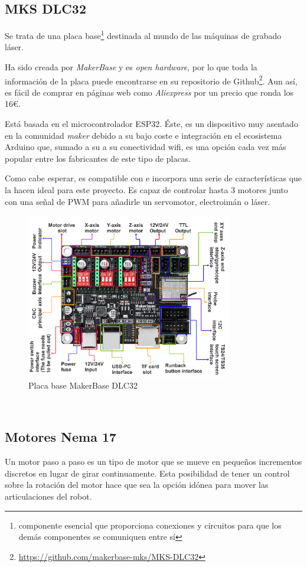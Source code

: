 \subsection{MKS DLC32}
\label{subsec:mksdlc32}
\noindent Se trata de una placa base\footnote{componente esencial que proporciona conexiones y circuitos para que los demás componentes se comuniquen entre sí} destinada al mundo de las máquinas de grabado láser. 

Ha sido creada por \textit{MakerBase} y es \textit{open hardware}, por lo que toda la información de la placa 
puede encontrarse en su repositorio de Github\footnote{\url{https://github.com/makerbase-mks/MKS-DLC32}}. Aun así, es fácil de comprar 
en páginas web como \textit{Aliexpress} por un precio que ronda los 16\euro. 

Está basada en el 
microcontrolador ESP32. Éste, es un dispositivo muy asentado en la comunidad \textit{maker} debido a su bajo coste e integración en el 
ecosistema Arduino que, sumado a su a su conectividad wifi, es una opción cada vez más popular entre los fabricantes de este tipo de placas.

Como cabe esperar, es compatible con  e incorpora una serie de características que la hacen ideal para este proyecto. Es capaz de 
controlar hasta 3 motores junto con una señal de \acs{PWM} para añadirle un servomotor, electroimán o láser.
\begin{figure} [h!]
    \begin{center}
      \includegraphics[width=9cm]{figs/MKS.png}
    \end{center}
    \caption{Placa base MakerBase DLC32}
    \label{fig:robSoldering}
  \end{figure}\ 

\subsection{Motores Nema 17}
\label{subsec:motores}
\noindent Un motor paso a paso es un tipo de motor que se mueve en pequeños incrementos discretos en lugar de girar continuamente. Esta  
posibilidad de tener un control sobre la rotación del motor hace que sea la opción idónea para mover las articulaciones del robot.

